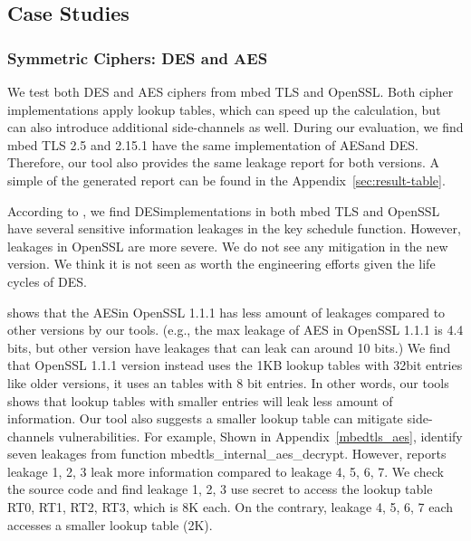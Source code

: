 \subsection{Case Studies}

\subsubsection{Symmetric Ciphers: DES and AES}\label{eval:sym}
We test both DES and AES ciphers from mbed TLS and OpenSSL. Both cipher
implementations apply lookup tables, which can
speed up the calculation, but can also introduce additional side-channels
as well. During our evaluation, we find mbed TLS 2.5 and 2.15.1 have the same
implementation of AES\@ and DES\@. Therefore, our tool also provides the same 
leakage report for both
versions. A simple of the generated report can be found in the Appendix~\ref{sec:result-table}.

According to \tool{}, we find DES\@ implementations in both mbed TLS and OpenSSL have several
sensitive information leakages in the key schedule function.
However, leakages in OpenSSL are more severe. We do not see any mitigation
in the new version. We think it is not seen as worth the engineering
efforts given the life cycles of DES\@.

\tool{} shows that the AES\@ in OpenSSL 1.1.1 
has less amount of leakages compared to other versions by our tools. 
(e.g., the max leakage of AES in OpenSSL 1.1.1 is 4.4 bits, but other version
have leakages that can leak can around 10 bits.)
We find that OpenSSL 1.1.1 version 
instead uses the 1KB lookup tables with 32bit entries like older versions, it uses an 
tables with 8 bit entries. In other words, our tools shows that lookup tables with smaller 
entries will leak less amount of information. Our tool also suggests a smaller lookup
table can mitigate side-channels vulnerabilities. For example, Shown in Appendix~\ref{mbedtls_aes},
\tool{} identify seven leakages from function \textsf{mbedtls\_internal\_aes\_decrypt}.
However, \tool{} reports leakage 1, 2, 3 leak more information
compared to leakage 4, 5, 6, 7. 
We check the source code and find leakage 1, 2,
3 use secret to access the lookup table \textsf{RT0, RT1, RT2, RT3}, which is 8K
each. On the contrary, leakage 4, 5, 6, 7 each accesses a smaller lookup table
(2K).


